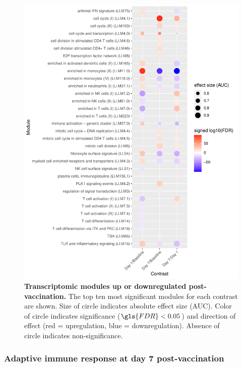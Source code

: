 \begin{figure}
    \includegraphics[width=1.0\textwidth]{mainmatter/figures/chapter_02/compare_dge_eqtl.tmodDotPlot.DGE.timepoint.pdf}
    \caption{
        \textbf{Transcriptomic modules up or downregulated post-vaccination.}
        The top ten most significant modules for each contrast are shown.
        Size of circle indicates absolute effect size (\gls{AUC}). 
        Color of circle indicates significance ($\gls{FDR} < 0.05$) and direction of effect (red = upregulation, blue = downregulation).
        Absence of circle indicates non-significance.
    }
    \label{fig:hird_tmodDotPlot_timepoint}
\end{figure}

\subsubsection{Adaptive immune response at day 7 post-vaccination}

